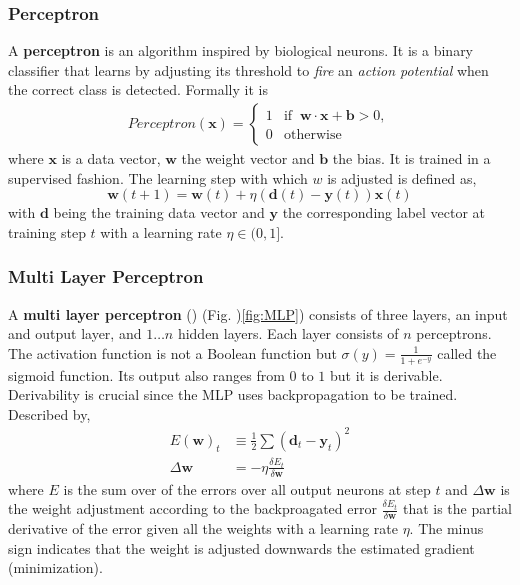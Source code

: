 \subsubsection{Perceptron}
A \textbf{perceptron} is an algorithm inspired by biological neurons. It is a binary classifier that learns by adjusting its threshold to \textsl{fire} an \textsl{action potential} when the correct class is detected. Formally it is
\begin{gather}
  Perceptron(\mathbf{x}) = \begin{cases}1 & \text{if }\ \mathbf{w} \cdot \mathbf{x} + \mathbf{b} > 0,\\
  0 & \text{otherwise}\end{cases}
\end{gather}
where $\mathbf{x}$ is a data vector, $\mathbf{w}$ the weight vector and $\mathbf{b}$ the bias. It is trained in a supervised fashion. The learning step with which $w$ is adjusted is defined as,
\[\mathbf{w}(t+1) = \mathbf{w}(t) + \eta (\mathbf{d}(t) - \mathbf{y}(t))\mathbf{x}(t)\]
with $\mathbf{d}$ being the training data vector and $\mathbf{y}$ the corresponding label vector at training step $t$ with a learning rate $\eta \in (0,1]$.

\subsubsection{Multi Layer Perceptron}
A \textbf{multi layer perceptron} () (Fig. )\ref{fig:MLP}) consists of three layers, an input and output layer, and $1 \dots n$ hidden layers. Each layer consists of $n$ perceptrons. The activation function is not a Boolean function but $\sigma(y) = \frac{1}{1+e^{-y}}$ called the sigmoid function. Its output also ranges from $0$ to $1$ but it is derivable. Derivability is crucial since the MLP uses backpropagation to be trained. Described by,
\begin{align}
  E(\mathbf{w})_t &\equiv \frac{1}{2} \sum (\mathbf{d}_t - \mathbf{y}_t)^2 \\
  \Delta \mathbf{w} &= - \eta \frac{\delta E_t}{\delta \mathbf{w}}
\end{align}
where $E$ is the sum over of the errors over all output neurons at step $t$ and $\Delta \mathbf{w}$ is the weight adjustment according to the backproagated error $\frac{\delta E_t}{\delta \mathbf{w}}$ that is the partial derivative of the error given all the weights with a learning rate $\eta$. The minus sign indicates that the weight is adjusted downwards the estimated gradient (minimization).


